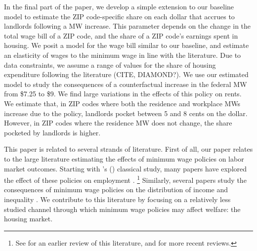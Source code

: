 
In the final part of the paper, we develop a simple extension to our baseline model
to estimate the ZIP code-specific share on each dollar that accrues to landlords
following a MW increase.
This parameter depends on the change in the total wage bill of a ZIP code, and the 
share of a ZIP code's earnings spent in housing.
We posit a model for the wage bill similar to our baseline, and estimate an elasticity
of wages to the minimum wage in line with the literature.
Due to data constraints, we assume a range of values for the share of housing
expenditure following the literature (CITE, DIAMOND?).
We use our estimated model to study the consequences of a counterfactual increase 
in the federal MW from \$7.25 to \$9.
We find large variations in the effects of this policy on rents.
We estimate that, in ZIP codes where both the residence and workplace MWs increase
due to the policy, landlords pocket between 5 and 8 cents on the dollar.
However, in ZIP codes where the residence MW does not change, the share pocketed
by landlords is higher.


This paper is related to several strands of literature.
First of all, our paper relates to the large literature estimating the effects of 
minimum wage policies on labor market outcomes.
Starting with \citeauthor{CardKrueger1994}'s (\citeyear{CardKrueger1994}) classical 
study, many papers have explored the effect of these policies on employment
\parencite[some recent examples include][]{MeerWest2016,CegnizEtAl2019}.%
\footnote{See \textcite{Neumark2006} for an earlier review of this literature,
and \textcite{Dube2019, NeumarkShirley2021} for more recent reviews.}
Similarly, several papers study the consequences of minimum wage policies on the 
distribution of income and inequality \parencite{Lee1999, AutorEtAl2016}.
We contribute to this literature by focusing on a relatively less studied channel
through which minimum wage policies may affect welfare: the housing market.

